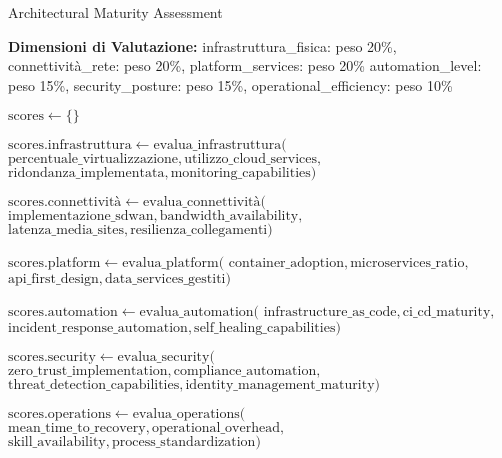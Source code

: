 \begin{algorithm}[H]
\caption{Architectural Maturity Assessment}
\label{alg:maturity-assessment}
\begin{algorithmic}[1]
\State \textbf{Dimensioni di Valutazione:}
\State infrastruttura\_fisica: peso 20\%, connettività\_rete: peso 20\%, platform\_services: peso 20\%
\State automation\_level: peso 15\%, security\_posture: peso 15\%, operational\_efficiency: peso 10\%

    \State $\text{scores} \leftarrow \{\}$
    
    \State $\text{scores.infrastruttura} \leftarrow \text{evalua\_infrastruttura}($
    \State \hspace{2em} $\text{percentuale\_virtualizzazione}, \text{utilizzo\_cloud\_services},$
    \State \hspace{2em} $\text{ridondanza\_implementata}, \text{monitoring\_capabilities})$
    
    \State $\text{scores.connettività} \leftarrow \text{evalua\_connettività}($
    \State \hspace{2em} $\text{implementazione\_sdwan}, \text{bandwidth\_availability},$
    \State \hspace{2em} $\text{latenza\_media\_sites}, \text{resilienza\_collegamenti})$
    
    \State $\text{scores.platform} \leftarrow \text{evalua\_platform}($
    \State \hspace{2em} $\text{container\_adoption}, \text{microservices\_ratio},$
    \State \hspace{2em} $\text{api\_first\_design}, \text{data\_services\_gestiti})$
    
    \State $\text{scores.automation} \leftarrow \text{evalua\_automation}($
    \State \hspace{2em} $\text{infrastructure\_as\_code}, \text{ci\_cd\_maturity},$
    \State \hspace{2em} $\text{incident\_response\_automation}, \text{self\_healing\_capabilities})$
    
    \State $\text{scores.security} \leftarrow \text{evalua\_security}($
    \State \hspace{2em} $\text{zero\_trust\_implementation}, \text{compliance\_automation},$
    \State \hspace{2em} $\text{threat\_detection\_capabilities}, \text{identity\_management\_maturity})$
    
    \State $\text{scores.operations} \leftarrow \text{evalua\_operations}($
    \State \hspace{2em} $\text{mean\_time\_to\_recovery}, \text{operational\_overhead},$
    \State \hspace{2em} $\text{skill\_availability}, \text{process\_standardization})$
    

\end{algorithmic}
\end{algorithm}
